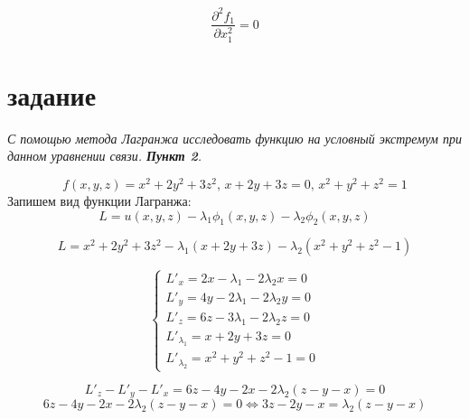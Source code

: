 \documentclass[a5paper, 10pt]{article}
\theoremstyle{definition}
\theoremstyle{plain}
\theoremstyle{remark}
\begin{document}
\begin{equation}
\frac{\partial ^ 2 f_1}{\partial x_1^2} = 0
\end{equation}










\newpage

\section{задание}
\textit{С помощью метода Лагранжа исследовать функцию на условный экстремум при данном уравнении связи. \textbf{Пункт 2}.}

\begin{equation}
f(x, y, z) = x^2+2y^2+3z^2, \, x + 2y+3z=0, \, x^2 +y^2+z^2=1
\end{equation}
Запишем вид функции Лагранжа:
\begin{equation}
L = u(x, y, z) - \lambda_1 \phi_1 (x, y, z) - \lambda_2 \phi_2 (x, y, z)
\end{equation}

\begin{equation}
L = x^2+2y^2+3z^2  - \lambda_1 \left(  x + 2y+3z \right) - \lambda_2 \left( x^2 +y^2+z^2 - 1   \right)
\end{equation}

\begin{equation}
\begin{cases}
L'_x = 2x - \lambda_1 -2 \lambda_2 x = 0\\
L'_y = 4y  - 2\lambda_1  - 2\lambda_2 y = 0\\
L'_z = 6z  - 3 \lambda_1  - 2\lambda_2 z = 0\\
L'_{\lambda_1}=   x + 2y+3z = 0\\
L'_ { \lambda_2} =  x^2 +y^2+z^2 - 1 = 0
\end{cases}
\end{equation}

\begin{equation}
L'_z - L'_y - L'_x = 6z-4y-2x -2 \lambda_2 (z - y - x) = 0
\end{equation}
\begin{equation}
6z-4y-2x -2 \lambda_2 (z - y - x) = 0 \Leftrightarrow 3z-2y-x = \lambda_2 (z - y - x)
\end{equation}
\end{document}
